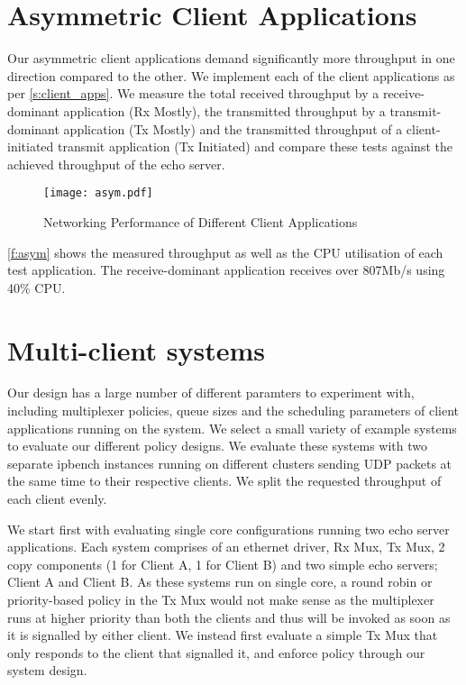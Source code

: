 \section{Asymmetric Client Applications}

Our asymmetric client applications demand significantly more throughput in one direction compared to the 
other. We implement each of the client applications as per \autoref{s:client_apps}.
We measure the total received throughput by a receive-dominant application (Rx Mostly), the
transmitted throughput by a transmit-dominant application (Tx Mostly) and the transmitted throughput
of a client-initiated transmit application (Tx Initiated) and compare these tests against the achieved
throughput of the echo server. 

\begin{figure}[h]
    \centering
    \texttt{[image: asym.pdf]}
    \caption{Networking Performance of Different Client Applications}
    \label{f:asym}
\end{figure}

\autoref{f:asym} shows the measured throughput as well as the CPU utilisation of each test application. The
receive-dominant application receives over 807Mb/s using 40\% CPU. 

\section{Multi-client systems}

Our design has a large number of different paramters to experiment with, including multiplexer
policies, queue sizes and the scheduling parameters of client applications running on the system. 
We select a small variety of example systems to evaluate our different policy designs. We evaluate
these systems with two separate ipbench instances running on different clusters sending UDP packets
at the same time to their respective clients. We split the requested throughput of each client evenly. 

We start first with evaluating single core configurations running two echo server applications. 
Each system comprises of an ethernet driver, Rx Mux, Tx Mux, 2 copy components (1 for Client A, 1 for Client B) 
and two simple echo servers; Client A and Client B. As these systems run on single core, a round robin or priority-based
policy in the Tx Mux would not make sense as the multiplexer runs at higher priority than both the clients and thus
will be invoked as soon as it is signalled by either client. We instead first evaluate a simple Tx Mux that only 
responds to the client that signalled it, and enforce policy through our system design. 

